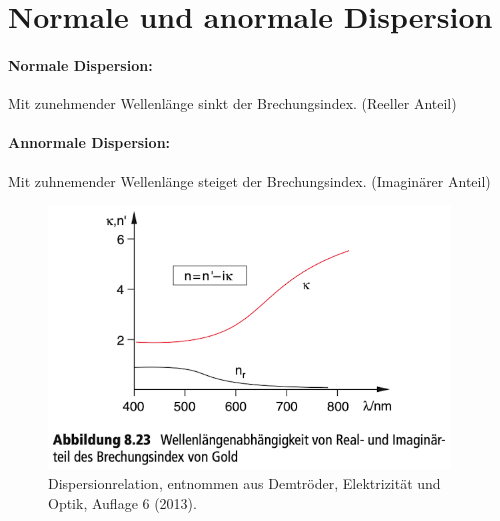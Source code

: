 
\section{Normale und anormale Dispersion}
\label{sec:dispersion}



\paragraph*{Normale Dispersion: }
Mit zunehmender Wellenlänge sinkt der Brechungsindex. (Reeller Anteil)

\paragraph*{Annormale Dispersion: }
Mit zuhnemender Wellenlänge steiget der Brechungsindex. (Imaginärer Anteil)

\begin{figure}[h]
    \includegraphics[width=0.95\textwidth]{Bilder/Dispersion.png}
    \caption{Dispersionrelation, entnommen aus Demtröder, Elektrizität und Optik, Auflage 6 (2013).}
\end{figure}